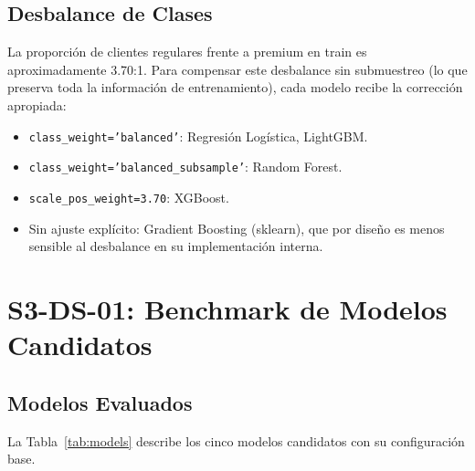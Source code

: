\documentclass[journal,letterpaper]{IEEEtran}
\begin{document}
\subsection{Desbalance de Clases}
La proporción de clientes regulares frente a premium en train es aproximadamente 3.70:1. Para compensar este desbalance sin submuestreo (lo que preserva toda la información de entrenamiento), cada modelo recibe la corrección apropiada:
\begin{itemize}
    \item \texttt{class\_weight='balanced'}: Regresión Logística, LightGBM.
    \item \texttt{class\_weight='balanced\_subsample'}: Random Forest.
    \item \texttt{scale\_pos\_weight=3.70}: XGBoost.
    \item Sin ajuste explícito: Gradient Boosting (sklearn), que por diseño es menos sensible al desbalance en su implementación interna.
\end{itemize}

\section{S3-DS-01: Benchmark de Modelos Candidatos}

\subsection{Modelos Evaluados}
La Tabla~\ref{tab:models} describe los cinco modelos candidatos con su configuración base.

\begin{table}[h]
\centering
\caption{Modelos Candidatos — Configuración Base}
\label{tab:models}
\end{table}
\end{document}
